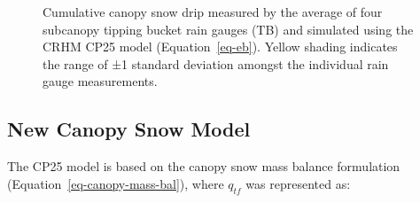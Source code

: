 \documentclass[
  letterpaper,
]{tex/uofsthesis-cs}
\begin{document}
\begin{figure}


\caption{\label{fig-cml-tb}Cumulative canopy snow drip measured by the
average of four subcanopy tipping bucket rain gauges (TB) and simulated
using the CRHM CP25 model (Equation~\ref{eq-eb}). Yellow shading
indicates the range of ±1 standard deviation amongst the individual rain
gauge measurements.}

\end{figure}%

\subsection{New Canopy Snow Model}\label{new-canopy-snow-model}

The CP25 model is based on the canopy snow mass balance formulation
(Equation~\ref{eq-canopy-mass-bal}), where \(q_{tf}\) was represented
as:
\end{document}
